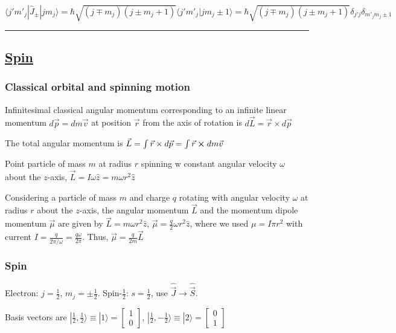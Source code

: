 $\langle j' m'_j | \widehat{J}_{\pm} | j m_j \rangle = \hbar \sqrt{(j \mp m_j) (j \pm m_j + 1)} \langle j' m'_j | j m_j \pm 1 \rangle = \hbar \sqrt{(j \mp m_j)(j \pm m_j + 1)} \delta_{j' j} \delta_{m'_j m_j \pm 1}$

\hrule height 0.05pt

\subsection{\underline{Spin}}

\subsubsection{Classical orbital and spinning motion}

Infinitesimal classical angular momentum corresponding to an infinite linear momentum $d \vec{p} = d m \vec{v}$ at position $\vec{r}$ from the axis of rotation is $d \vec{L} = \vec{r} \times d \vec{p}$

The total angular momentum is $\vec{L} = \int \vec{r} \times d \vec{p} = \int \vec{r} \cross d m \vec{v}$

Point particle of mass $m$ at radius $r$ spinning w constant angular velocity $\omega$ about the $z$-axis, $\vec{L} = I \omega \widehat{z} = m \omega r^2 \widehat{z}$

Considering a particle of mass $m$ and charge $q$ rotating with angular velocity $\omega$ at radius $r$ about the $z$-axis, the angular momentum $\vec{L}$ and the momentum dipole momentum $\vec{\mu}$ are given by $\vec{L} = m \omega r^2 \widehat{z}$, $\vec{\mu} = \frac{q}{2} \omega r^2 \widehat{z}$, where we used $\mu = I \pi r^2$ with current $I = \frac{q}{2 \pi / \omega} = \frac{q \omega}{2 \pi}$. Thus, $\vec{\mu} = \frac{q}{2m} \vec{L}$

\subsubsection{Spin}

Electron: $j = \frac{1}{2}$, $m_j = \pm \frac{1}{2}$. Spin-$\frac{1}{2}$: $s=\frac{1}{2}$, use $\widehat{\vec{J}} \rightarrow \widehat{\vec{S}}$.

Basis vectors are $| \frac{1}{2}, \frac{1}{2} \rangle \equiv | 1 \rangle = \begin{bmatrix} 1 \\ 0 \end{bmatrix}$, $| \frac{1}{2}, -\frac{1}{2} \rangle \equiv | 2 \rangle = \begin{bmatrix} 0 \\ 1 \end{bmatrix}$

